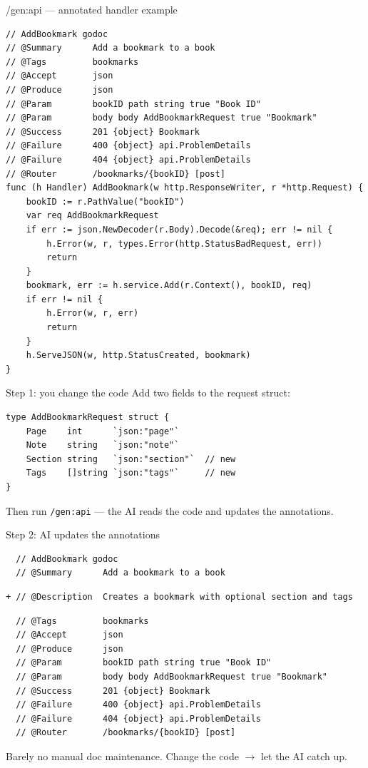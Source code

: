 \documentclass[aspectratio=169,11pt]{beamer}
\begin{document}
\begin{frame}[fragile]{/gen:api --- annotated handler example}
\begin{lstlisting}
// AddBookmark godoc
// @Summary      Add a bookmark to a book
// @Tags         bookmarks
// @Accept       json
// @Produce      json
// @Param        bookID path string true "Book ID"
// @Param        body body AddBookmarkRequest true "Bookmark"
// @Success      201 {object} Bookmark
// @Failure      400 {object} api.ProblemDetails
// @Failure      404 {object} api.ProblemDetails
// @Router       /bookmarks/{bookID} [post]
func (h Handler) AddBookmark(w http.ResponseWriter, r *http.Request) {
	bookID := r.PathValue("bookID")
	var req AddBookmarkRequest
	if err := json.NewDecoder(r.Body).Decode(&req); err != nil {
		h.Error(w, r, types.Error(http.StatusBadRequest, err))
		return
	}
	bookmark, err := h.service.Add(r.Context(), bookID, req)
	if err != nil {
		h.Error(w, r, err)
		return
	}
	h.ServeJSON(w, http.StatusCreated, bookmark)
}
\end{lstlisting}
\end{frame}

\begin{frame}[fragile]{Step 1: you change the code}
  Add two fields to the request struct:

\begin{lstlisting}
type AddBookmarkRequest struct {
	Page    int      `json:"page"`
	Note    string   `json:"note"`
	Section string   `json:"section"`  // new
	Tags    []string `json:"tags"`     // new
}
\end{lstlisting}

  \vspace{4pt}
  Then run \texttt{/gen:api} --- the AI reads the code and updates the annotations.
\end{frame}

\begin{frame}[fragile]{Step 2: AI updates the annotations}
\begin{lstlisting}
  // AddBookmark godoc
  // @Summary      Add a bookmark to a book
\end{lstlisting}
\begin{lstlisting}[commentstyle=\itshape\color{added}]
+ // @Description  Creates a bookmark with optional section and tags
\end{lstlisting}
\begin{lstlisting}
  // @Tags         bookmarks
  // @Accept       json
  // @Produce      json
  // @Param        bookID path string true "Book ID"
  // @Param        body body AddBookmarkRequest true "Bookmark"
  // @Success      201 {object} Bookmark
  // @Failure      400 {object} api.ProblemDetails
  // @Failure      404 {object} api.ProblemDetails
  // @Router       /bookmarks/{bookID} [post]
\end{lstlisting}

  \vspace{4pt}
  {\small Barely no manual doc maintenance. Change the code \(\rightarrow\) let the AI catch up.}
\end{frame}
\end{document}
